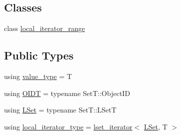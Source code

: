\subsection*{Classes}
\begin{DoxyCompactItemize}
\item 
class \hyperlink{classshad_1_1set__iterator_1_1local__iterator__range}{local\-\_\-iterator\-\_\-range}
\end{DoxyCompactItemize}
\subsection*{Public Types}
\begin{DoxyCompactItemize}
\item 
using \hyperlink{classshad_1_1set__iterator_aa1c2447817e9c3156a213363f8914b29}{value\-\_\-type} = T
\item 
using \hyperlink{classshad_1_1set__iterator_a2da49754284fd7ddf591c2df4123b57d}{O\-I\-D\-T} = typename Set\-T\-::\-Object\-I\-D
\item 
using \hyperlink{classshad_1_1set__iterator_a526f8a1656d9a4826cf9d0ec1ab60ac6}{L\-Set} = typename Set\-T\-::\-L\-Set\-T
\item 
using \hyperlink{classshad_1_1set__iterator_a162b1b9d8dfe2e3a656fcdacf0450939}{local\-\_\-iterator\-\_\-type} = \hyperlink{classshad_1_1lset__iterator}{lset\-\_\-iterator}$<$ \hyperlink{classshad_1_1set__iterator_a526f8a1656d9a4826cf9d0ec1ab60ac6}{L\-Set}, T $>$
\end{DoxyCompactItemize}
